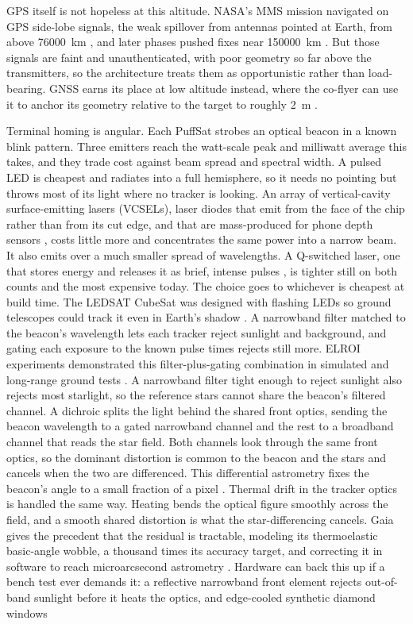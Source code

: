 \documentclass{article}
\begin{document}
GPS itself is not hopeless at this altitude. NASA's MMS mission navigated on GPS side-lobe signals, the weak spillover from antennas pointed at Earth, from above \SI{76000}{\kilo\meter} \cite{winternitz2017mms}, and later phases pushed fixes near \SI{150000}{\kilo\meter} \cite{winternitz2017mmsion}. But those signals are faint and unauthenticated, with poor geometry so far above the transmitters, so the architecture treats them as opportunistic rather than load-bearing. GNSS earns its place at low altitude instead, where the co-flyer can use it to anchor its geometry relative to the target to roughly \SI{2}{\meter} \cite{Katz_puffsat_control_sim_2026}.

Terminal homing is angular. Each PuffSat strobes an optical beacon in a known blink pattern. Three emitters reach the watt-scale peak and milliwatt average this takes, and they trade cost against beam spread and spectral width. A pulsed LED is cheapest and radiates into a full hemisphere, so it needs no pointing but throws most of its light where no tracker is looking. An array of vertical-cavity surface-emitting lasers (VCSELs), laser diodes that emit from the face of the chip rather than from its cut edge, and that are mass-produced for phone depth sensors \cite{iga2018vcsel}, costs little more and concentrates the same power into a narrow beam. It also emits over a much smaller spread of wavelengths. A Q-switched laser, one that stores energy and releases it as brief, intense pulses \cite{mcclung1962qswitch}, is tighter still on both counts and the most expensive today. The choice goes to whichever is cheapest at build time. The LEDSAT CubeSat was designed with flashing LEDs so ground telescopes could track it even in Earth's shadow \cite{santoni2018ledsat}. A narrowband filter matched to the beacon's wavelength lets each tracker reject sunlight and background, and gating each exposure to the known pulse times rejects still more.  ELROI experiments demonstrated this filter-plus-gating combination in simulated and long-range ground tests \cite{holmes2019elroi}. A narrowband filter tight enough to reject sunlight also rejects most starlight, so the reference stars cannot share the beacon's filtered channel. A dichroic splits the light behind the shared front optics, sending the beacon wavelength to a gated narrowband channel and the rest to a broadband channel that reads the star field. Both channels look through the same front optics, so the dominant distortion is common to the beacon and the stars and cancels when the two are differenced. This differential astrometry fixes the beacon's angle to a small fraction of a pixel \cite{liebe2002startracker}. Thermal drift in the tracker optics is handled the same way. Heating bends the optical figure smoothly across the field, and a smooth shared distortion is what the star-differencing cancels. Gaia gives the precedent that the residual is tractable, modeling its thermoelastic basic-angle wobble, a thousand times its accuracy target, and correcting it in software to reach microarcsecond astrometry \cite{lindegren2018gaia}. Hardware can back this up if a bench test ever demands it: a reflective narrowband front element rejects out-of-band sunlight before it heats the optics, and edge-cooled synthetic diamond windows 
\end{document}
